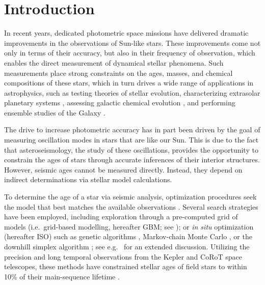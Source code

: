 \documentclass[iop,apj,twocolappendix]{emulateapj}
\begin{document}


\section{Introduction}
In recent years, dedicated photometric space missions have delivered dramatic improvements in the observations of Sun-like stars. These improvements come not only in terms of their accuracy, but also in their frequency of observation, which enables the direct measurement of dynamical stellar phenomena. Such measurements place strong constraints on the ages, masses, and chemical compositions of these stars, which in turn drives a wide range of applications in astrophysics, such as testing theories of stellar evolution, characterizing extrasolar planetary systems \citep[e.g.][]{2015ApJ...799..170C,2015MNRAS.452.2127S}, assessing galactic chemical evolution \citep[e.g.][]{2015ASSP...39..111C}, and performing ensemble studies of the Galaxy \citep[e.g.][]{2011Sci...332..213C, 2013MNRAS.429..423M, 2014ApJS..210....1C}. 

The drive to increase photometric accuracy has in part been driven by the goal of measuring oscillation modes in stars that are like our Sun. This is due to the fact that asteroseismology, the study of these oscillations, provides the opportunity to constrain the ages of stars through accurate inferences of their interior structures. However, seismic ages cannot be measured directly. Instead, they depend on indirect determinations via stellar model calculations. 

To determine the age of a star via seismic analysis, optimization procedures seek the model that best matches the available observations \citep{1994ApJ...427.1013B}. 
Several search strategies have been employed, including exploration through a pre-computed grid of models (i.e.\ grid-based modelling, hereafter GBM; see \citealt{2011ApJ...730...63G, 2014ApJS..210....1C}); or \emph{in situ} optimization (hereafter ISO) such as genetic algorithms \citep{2014ApJS..214...27M}, Markov-chain Monte Carlo \citep{2012MNRAS.427.1847B}, or the downhill simplex algorithm \citep{2013ApJS..208....4P}; see e.g.\ \citealt{2015MNRAS.452.2127S} for an extended discussion. Utilizing the precision and long temporal observations from the Kepler and CoRoT space telescopes, these methods have constrained stellar ages of field stars to within 10\% of their main-sequence lifetime \citep{2015MNRAS.452.2127S}. 
\end{document}
